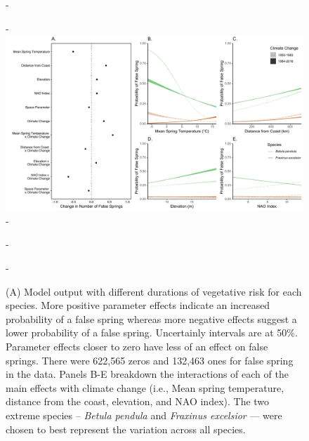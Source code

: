 \documentclass{article}\usepackage[]{graphicx}\usepackage[]{color}
\begin{document}
  {\begin{figure} [H]
  -\begin{center}
  -\includegraphics[width=12cm]{..//figures/MainModel_wAPCplots_dvr.pdf}
  -\caption{(A) Model output with different durations of vegetative risk for each species. More positive parameter effects indicate an increased probability of a false spring whereas more negative effects suggest a lower probability of a false spring. Uncertainly intervals are at 50\%. Parameter effects closer to zero have less of an effect on false springs. There were 622,565 zeros and 132,463 ones for false spring in the data. Panels B-E breakdown the interactions of each of the main effects with climate change (i.e., Mean spring temperature, distance from the coast, elevation, and NAO index). The two extreme species -- \textit{Betula pendula} and \textit{Fraxinus excelsior} --- were chosen to best represent the variation across all species.}\label{fig:dvr}
  -\end{center}
  -\end{figure}}
\end{document}
